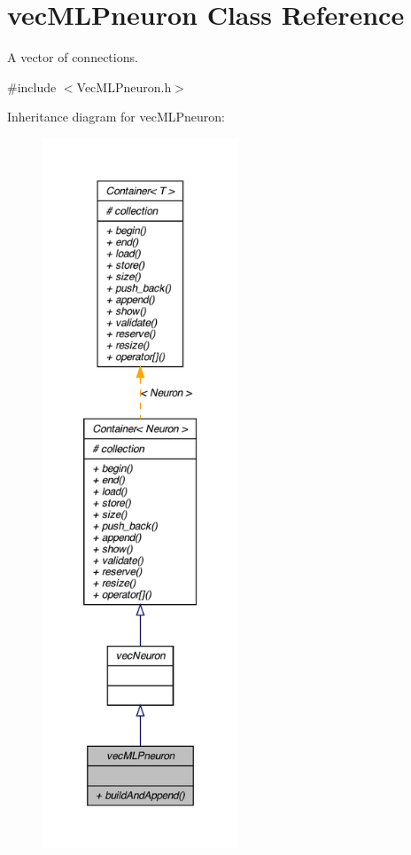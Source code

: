 \hypertarget{classvec_m_l_pneuron}{
\section{vecMLPneuron Class Reference}
\label{classvec_m_l_pneuron}
}


A vector of connections.  




{\ttfamily \#include $<$VecMLPneuron.h$>$}



Inheritance diagram for vecMLPneuron:\nopagebreak
\begin{figure}[H]
\begin{center}
\leavevmode
\includegraphics[height=600pt]{classvec_m_l_pneuron__inherit__graph}
\end{center}
\end{figure}


